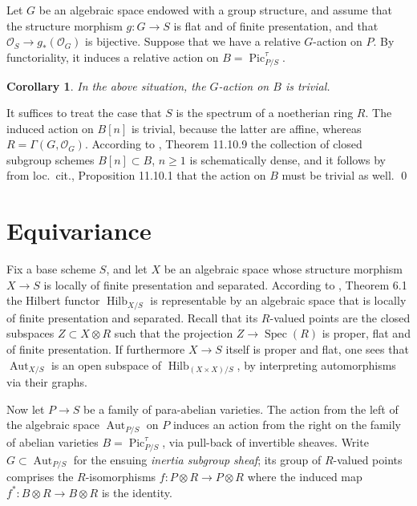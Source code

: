 \documentclass[oneside, 12pt]{amsart}
\newcommand\mylabel[1]{\label{#1}\marginpar{\raggedright\vspace{-1ex}\medskip\medskip\footnotesize \tt #1}}
\renewcommand\mylabel[1]{\label{#1}}
\newtheorem{corollary}[theorem]{Corollary}
\theoremstyle{definition}
\theoremstyle{remark}
\newcommand{\Aut}{\operatorname{Aut}}
\newcommand{\Hilb}{\operatorname{Hilb}}
\renewcommand{\O}{\mathscr{O}}
\newcommand{\Pic}{\operatorname{Pic}}
\newcommand{\ra}{\rightarrow}
\newcommand{\Spec}{\operatorname{Spec}}
\begin{document}
\medskip
Let $G $ be an algebraic space endowed with a group structure,  and assume that the structure morphism $g:G\ra S$ is   flat and of finite presentation,
and that $\O_S\ra g_*(\O_G)$ is bijective.
Suppose that we have a relative $G$-action  on $P$. By functoriality, it induces a relative action on $B=\Pic^\tau_{P/S}$.

\begin{corollary}
\mylabel{induced action trivial}
In the above situation, the $G$-action on $B$ is trivial. 
\end{corollary}

\proof
It suffices to treat the case that $S$ is the spectrum of a noetherian ring $R$.
The induced action on $B[n]$ is trivial, because the latter are affine, whereas $R=\Gamma(G,\O_G)$.
According to \cite{EGA IVc}, Theorem 11.10.9  the collection of closed subgroup schemes $B[n]\subset B$, $n\geq 1$ is schematically dense, 
and it follows by from loc.\ cit., Proposition 11.10.1 that the action on $B$ must be trivial as well.
\qed


\section{Equivariance}
\mylabel{Equivariance}

Fix a base scheme $S$, and let $X$ be an algebraic space whose structure morphism  $X\ra S$   is  locally of finite presentation and separated.
According to \cite{Artin 1969}, Theorem 6.1 the Hilbert functor $\Hilb_{X/S}$ is representable
by an algebraic space that is locally of finite presentation and separated. Recall that its $R$-valued points
are the closed subspaces $Z\subset X\otimes R$ such that the projection $Z\ra \Spec(R)$ is proper, flat and
of finite presentation.
If furthermore $X\ra S$ itself is proper and flat, one sees that $\Aut_{X/S}$ is an open subspace of $\Hilb_{(X\times X)/S}$,
by interpreting automorphisms via their graphs.

Now let $P\ra S$ be a family of para-abelian varieties. 
The action from the left of the algebraic  space 
$\Aut_{P/S}$ on $P$ induces an action from the right on the family of abelian varieties $B=\Pic^\tau_{P/S}$, via pull-back of invertible sheaves.
Write $G\subset\Aut_{P/S}$ for the ensuing \emph{inertia subgroup sheaf}; its group of $R$-valued points comprises the $R$-isomorphisms  $f:P\otimes R\ra P\otimes R$
where the induced map $f^*:B\otimes R\ra B\otimes R$ is the identity.
\end{document}
